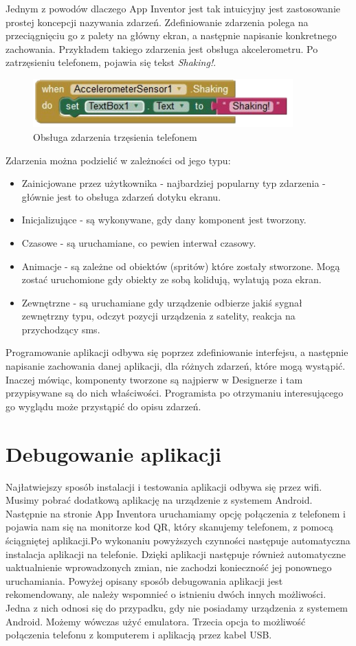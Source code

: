 Jednym z powodów dlaczego App Inventor jest tak intuicyjny jest zastosowanie prostej koncepcji nazywania zdarzeń. Zdefiniowanie zdarzenia polega na przeciągnięciu go z palety na główny ekran, a następnie napisanie konkretnego zachowania. Przykładem takiego zdarzenia jest obsługa akcelerometru. Po zatrzęsieniu telefonem, pojawia się tekst \emph{Shaking!}.

\begin{figure}[th] 
\centering\includegraphics[width=10cm]{figures/shakingEvent}
\caption{Obsługa zdarzenia trzęsienia telefonem}
\end{figure}

Zdarzenia można podzielić w zależności od jego typu:
\begin{itemize}
\item Zainicjowane przez użytkownika - najbardziej popularny typ zdarzenia - głównie jest to obsługa zdarzeń dotyku ekranu.
\item Inicjalizujące - są wykonywane, gdy dany komponent jest tworzony.
\item Czasowe - są uruchamiane, co pewien interwał czasowy.
\item Animacje - są zależne od obiektów (spritów) które zostały stworzone. Mogą zostać uruchomione gdy obiekty ze sobą kolidują, wylatują poza ekran.
\item Zewnętrzne - są uruchamiane gdy urządzenie odbierze jakiś sygnał zewnętrzny typu, odczyt pozycji urządzenia z satelity, reakcja na przychodzący sms.
\end{itemize}

Programowanie aplikacji odbywa się poprzez zdefiniowanie interfejsu, a następnie napisanie zachowania danej aplikacji, dla różnych zdarzeń, które mogą wystąpić. Inaczej mówiąc, komponenty tworzone są najpierw w Designerze i tam przypisywane są do nich właściwości. Programista po otrzymaniu interesującego go wyglądu może przystąpić do opisu zdarzeń.

\section{Debugowanie aplikacji}
\label{c33}

Najłatwiejszy sposób instalacji i testowania aplikacji odbywa się przez wifi. Musimy pobrać dodatkową aplikację na urządzenie z systemem Android. Następnie na stronie App Inventora uruchamiamy opcję połączenia z telefonem i pojawia nam się na monitorze kod QR, który skanujemy telefonem, z pomocą ściągniętej aplikacji.Po wykonaniu powyższych czynności następuje automatyczna instalacja aplikacji na telefonie. Dzięki aplikacji następuje również automatyczne uaktualnienie wprowadzonych zmian, nie zachodzi konieczność jej ponownego uruchamiania. 
Powyżej opisany sposób debugowania aplikacji jest rekomendowany, ale należy wspomnieć o istnieniu dwóch innych możliwości. Jedna z nich odnosi się do przypadku, gdy nie posiadamy urządzenia z systemem Android. Możemy wówczas użyć emulatora. Trzecia opcja to możliwość połączenia telefonu z komputerem i aplikacją przez kabel USB. 
